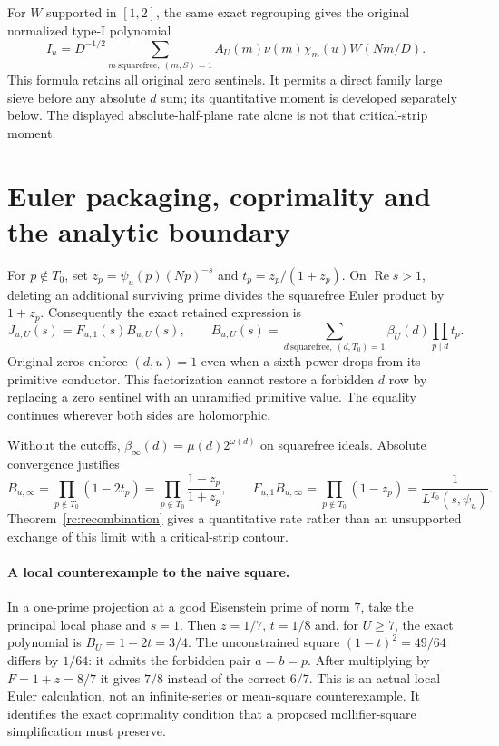\documentclass[11pt,oneside,openany]{book}
\theoremstyle{definition}\newtheorem{definition}[theorem]{Definition}
\theoremstyle{remark}\newtheorem{remark}[theorem]{Remark}
\begin{document}
For $W$ supported in $[1,2]$, the same exact regrouping gives the
original normalized type-I polynomial
\[
 I_u=D^{-1/2}\sum_{m\ \mathrm{squarefree},\ (m,S)=1}
 A_U(m)\nu(m)\chi_m(u)W(Nm/D).
\]
This formula retains all original zero sentinels. It permits a direct
family large sieve before any absolute $d$ sum; its quantitative moment
is developed separately below. The displayed absolute-half-plane rate
alone is not that critical-strip moment.

\section{Euler packaging, coprimality and the analytic boundary}
\label{rc:details}
For $p\notin T_0$, set $z_p=\psi_u(p)(Np)^{-s}$ and
$t_p=z_p/(1+z_p)$. On $\operatorname{Re}s>1$, deleting an additional
surviving prime divides the squarefree Euler product by $1+z_p$.
Consequently the exact retained expression is
\[
 J_{u,U}(s)=F_{u,1}(s)B_{u,U}(s),\qquad
 B_{u,U}(s)=\sum_{d\ \mathrm{squarefree},\ (d,T_0)=1}
                 \beta_U(d)\prod_{p\mid d}t_p.
\]
Original zeros enforce $(d,u)=1$ even when a sixth power drops from
its primitive conductor. This factorization cannot restore a forbidden
$d$ row by replacing a zero sentinel with an unramified primitive value.
The equality continues wherever both sides are holomorphic.

Without the cutoffs, $\beta_\infty(d)=\mu(d)2^{\omega(d)}$ on
squarefree ideals. Absolute convergence justifies
\[
 B_{u,\infty}=\prod_{p\notin T_0}(1-2t_p)
 =\prod_{p\notin T_0}\frac{1-z_p}{1+z_p},\qquad
 F_{u,1}B_{u,\infty}=\prod_{p\notin T_0}(1-z_p)
                   =\frac1{L^{T_0}(s,\psi_u)}.
\]
Theorem~\ref{rc:recombination} gives a quantitative rate rather than an
unsupported exchange of this limit with a critical-strip contour.

\paragraph{A local counterexample to the naive square.}
In a one-prime projection at a good Eisenstein prime of norm $7$, take
the principal local phase and $s=1$. Then $z=1/7$, $t=1/8$ and,
for $U\ge7$, the exact polynomial is $B_U=1-2t=3/4$.
The unconstrained square $(1-t)^2=49/64$ differs by $1/64$:
it admits the forbidden pair $a=b=p$. After multiplying by
$F=1+z=8/7$ it gives $7/8$ instead of the correct $6/7$.
This is an actual local Euler calculation, not an infinite-series or
mean-square counterexample. It identifies the exact coprimality condition
that a proposed mollifier-square simplification must preserve.
\end{document}
